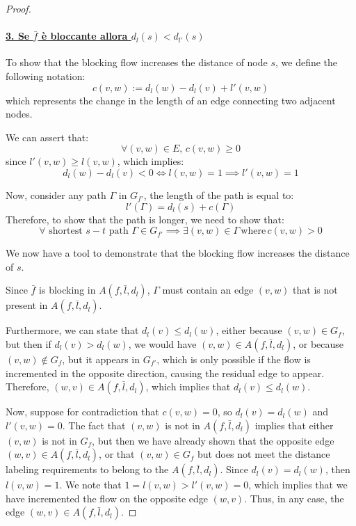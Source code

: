 \begin{proof}
        \paragraph*{\underline{3. Se $\bar{f}$ è bloccante allora $d_l(s) < d_{l'}(s)$}}

To show that the blocking flow increases the distance of node \( s \), we define the following notation:
        \[
c(v,w) := d_l(w) - d_l(v) + l'(v,w)
        \]
which represents the change in the length of an edge connecting two adjacent nodes.

We can assert that:
        \[
        \forall (v,w) \in E, \, c(v,w) \ge 0
        \]
since \( l'(v,w) \ge l(v,w) \), which implies:
        \[
d_l(w) - d_l(v) < 0 \iff l(v,w) = 1 \implies l'(v,w) = 1
        \]

Now, consider any path \( \Gamma \) in \( G_{f'} \), the length of the path is equal to:
        \[
l'(\Gamma) = d_l(s) + c(\Gamma)
        \]
Therefore, to show that the path is longer, we need to show that:
        \[
        \forall \text{ shortest } s-t \text{ path } \Gamma \in G_{f'} \implies \exists (v,w) \in \Gamma \, \text{where} \, c(v,w) > 0
        \]

We now have a tool to demonstrate that the blocking flow increases the distance of $s$.

        

Since \( \bar{f} \) is blocking in \( A(f,\bar{l}, d_l) \), \( \Gamma \) must contain an edge \( (v,w) \) that is not present in \( A(f,\bar{l}, d_l) \).
        
Furthermore, we can state that \( d_l(v) \leq d_l(w) \), either because \( (v,w) \in G_f \), but then if \( d_l(v) > d_l(w) \), we would have \( (v,w) \in A(f,\bar{l}, d_l) \),  
or because \( (v,w) \notin G_f \), but it appears in \( G_{f'} \), which is only possible if the flow is incremented in the opposite direction, causing the residual edge to appear. Therefore, \( (w,v) \in A(f,\bar{l}, d_l) \), which implies that \( d_l(v) \leq d_l(w) \).
        
Now, suppose for contradiction that \( c(v,w) = 0 \), so \( d_l(v) = d_l(w) \) and \( l'(v,w) = 0 \).  
The fact that \( (v,w) \) is not in \( A(f,\bar{l}, d_l) \) implies that either \( (v,w) \) is not in \( G_f \), but then we have already shown that the opposite edge \( (w,v) \in A(f,\bar{l}, d_l) \),  
or that \( (v,w) \in G_f \) but does not meet the distance labeling requirements to belong to the  \( A(f,\bar{l}, d_l) \).  
Since \( d_l(v) = d_l(w) \), then \( l(v,w) = 1 \). We note that \( 1 = l(v,w) > l'(v,w) = 0 \), which implies that we have incremented the flow on the opposite edge \( (w,v) \).  
Thus, in any case, the edge \( (w,v) \in A(f,\bar{l}, d_l) \).
        

\end{proof}
